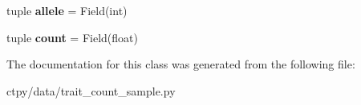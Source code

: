 \begin{DoxyCompactItemize}
\item 
\hypertarget{classctpy_1_1data_1_1trait__count__sample_1_1_trait_count_sample_a4302dc23e3709cd5c42d90a1ce015bee}{tuple {\bfseries allele} = Field(int)}\label{classctpy_1_1data_1_1trait__count__sample_1_1_trait_count_sample_a4302dc23e3709cd5c42d90a1ce015bee}

\item 
\hypertarget{classctpy_1_1data_1_1trait__count__sample_1_1_trait_count_sample_a63f3169f758c96b45199a72bdf2737d5}{tuple {\bfseries count} = Field(float)}\label{classctpy_1_1data_1_1trait__count__sample_1_1_trait_count_sample_a63f3169f758c96b45199a72bdf2737d5}

\end{DoxyCompactItemize}


The documentation for this class was generated from the following file\-:\begin{DoxyCompactItemize}
\item 
ctpy/data/trait\-\_\-count\-\_\-sample.\-py\end{DoxyCompactItemize}
